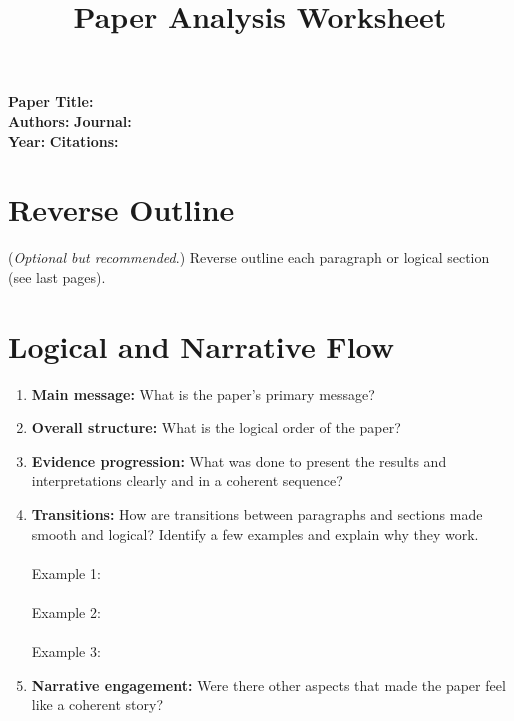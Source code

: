 \documentclass[10pt]{article}
\title{Paper Analysis Worksheet}
\author{}
\date{}
\begin{document}
	
	\maketitle
	\vspace{-1.5cm} 

	\noindent
	\textbf{Paper Title:} \\
	\textbf{Authors:} \hspace{5.4cm}	\textbf{Journal:} \\
	\textbf{Year:}  \hspace{6cm}	\textbf{Citations:} \\
	
	\vspace{-0.5cm} 
	\section*{Reverse Outline}
	(\textit{Optional but recommended}.) Reverse outline each paragraph or logical section (see last pages).
	

	
	\section*{Logical and Narrative Flow}
	
	\begin{enumerate}[label=\arabic*.]
		\item \textbf{Main message:}  What is the paper's primary message?\\
		\vspace{4em}
		\item \textbf{Overall structure:} What is the logical order of the paper? \\
		\vspace{6em}
		\item \textbf{Evidence progression:} What was done to present the results and interpretations clearly and in a 
		coherent sequence? \\
		\vspace{4em}
		\item \textbf{Transitions:} How are transitions between paragraphs and sections made smooth and logical? 
		Identify a few examples and explain why they work. \\ \\
		Example 1: \underline{\hspace{14cm}}\\ \\
		Example 2: \underline{\hspace{14cm}}\\ \\
		Example 3: \underline{\hspace{14cm}}\\
		\vspace{5em}
		\item \textbf{Narrative engagement:} Were there other aspects that made the paper feel like a coherent story? \\
		\vspace{4em}
		\end{enumerate}
	
\end{document}
